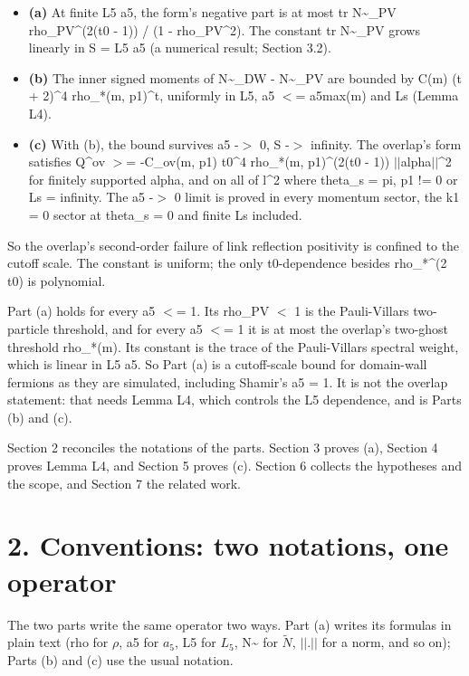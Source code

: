\documentclass[11pt,a4paper]{article}
\begin{document}
\begin{itemize}
\item{} {\bfseries\boldmath (a)} At finite L5 a5, the form's negative part is at most tr N\textasciitilde{}\_PV rho\_PV\textasciicircum{}(2(t0 - 1)) / (1 - rho\_PV\textasciicircum{}2). The
constant tr N\textasciitilde{}\_PV grows linearly in S = L5 a5 (a numerical result; Section 3.2).
\item{} {\bfseries\boldmath (b)} The inner signed moments of N\textasciitilde{}\_DW - N\textasciitilde{}\_PV are bounded by C(m) (t + 2)\textasciicircum{}4 rho\_*(m, p1)\textasciicircum{}t, uniformly in L5,
a5 $<$= a5max(m) and Ls (Lemma L4).
\item{} {\bfseries\boldmath (c)} With (b), the bound survives a5 -$>$ 0, S -$>$ infinity. The overlap's form satisfies
Q\textasciicircum{}ov $>$= -C\_ov(m, p1) t0\textasciicircum{}4 rho\_*(m, p1)\textasciicircum{}(2(t0 - 1)) $|$$|$alpha$|$$|$\textasciicircum{}2 for finitely supported alpha, and on all of l\textasciicircum{}2
where theta\_s = pi, p1 != 0 or Ls = infinity. The a5 -$>$ 0 limit is proved in every momentum
sector, the k1 = 0 sector at theta\_s = 0 and finite Ls included.
\end{itemize}

So the overlap's second-order failure of link reflection positivity is confined to the cutoff scale. The constant
is uniform; the only t0-dependence besides rho\_*\textasciicircum{}(2 t0) is polynomial.

Part (a) holds for every a5 $<$= 1. Its rho\_PV $<$ 1 is the Pauli-Villars two-particle threshold, and for every
a5 $<$= 1 it is at most the overlap's two-ghost threshold rho\_*(m). Its constant is the trace of the Pauli-Villars
spectral weight, which is linear in L5 a5. So Part (a) is a cutoff-scale bound for domain-wall fermions as they are
simulated, including Shamir's a5 = 1. It is not the overlap statement: that needs Lemma L4, which controls the L5
dependence, and is Parts (b) and (c).

Section 2 reconciles the notations of the parts. Section 3 proves (a), Section 4 proves Lemma L4, and Section 5
proves (c). Section 6 collects the hypotheses and the scope, and Section 7 the related work.


\section*{2. Conventions: two notations, one operator}
The two parts write the same operator two ways. Part (a) writes its formulas in plain text (rho for $\rho$, a5 for
$a_5$, L5 for $L_5$, N\textasciitilde{} for $\tilde N$, $|$$|$.$|$$|$ for a norm, and so on); Parts (b) and (c) use the usual notation.
\end{document}
